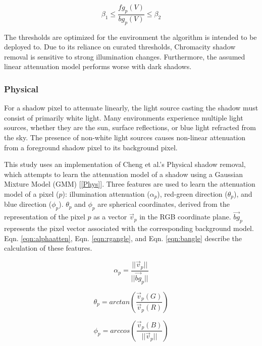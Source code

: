 \documentclass[12pt]{report}
\begin{document}
\begin{equation} \label{eqn:brightthresh}
\beta_{1} \leq \dfrac{fg_{p}(V)}{bg_{p}(V)} \leq \beta_{2}
\end{equation}

The thresholds are optimized for the environment the algorithm is intended to be deployed to. Due to its reliance on curated thresholds, Chromacity shadow removal is sensitive to strong illumination changes. Furthermore, the assumed linear attenuation model performs worse with dark shadows. 

\subsubsection{Physical}

For a shadow pixel to attenuate linearly, the light source casting the shadow must consist of primarily white light. Many environments experience multiple light sources, whether they are the sun, surface reflections, or blue light refracted from the sky. The presence of non-white light sources causes non-linear attenuation from a foreground shadow pixel to its background pixel.

This study uses an implementation of Cheng et al.'s Physical shadow removal, which attempts to learn the attenuation model of a shadow using a Gaussian Mixture Model (GMM) [\ref{Phys}]. Three features are used to learn the attenuation model of a pixel ($p$): illumination attenuation ($\alpha_{p}$), red-green direction ($\theta_{p}$), and blue direction ($\phi_{p}$). $\theta_{p}$ and $\phi_{p}$ are spherical coordinates, derived from the representation of the pixel $p$ as a vector $\vec{v}_{p}$ in the RGB coordinate plane. $\vec{bg}_{p}$ represents the pixel vector associated with the corresponding background model. Eqn. \ref{eqn:alphaatten}, Eqn. \ref{eqn:rgangle}, and Eqn. \ref{eqn:bangle} describe the calculation of these features.

\begin{equation} \label{eqn:alphaatten}
\alpha_{p} = \dfrac{||\vec{v}_{p}||}{||\vec{bg}_{p}||}
\end{equation}

\begin{equation} \label{eqn:rgangle}
\theta_{p} = arctan(\dfrac{\vec{v}_{p}(G)}{\vec{v}_{p}(R)})
\end{equation}

\begin{equation} \label{eqn:bangle}
\phi_{p} = arccos(\dfrac{\vec{v}_{p}(B)}{||\vec{v}_{p}||})
\end{equation}
\end{document}
